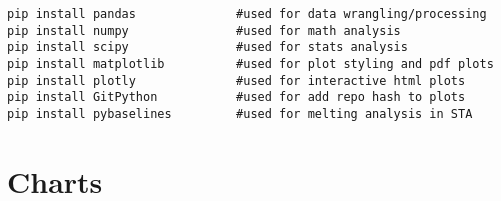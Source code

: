 \documentclass[12pt,oneside]{book}
\begin{document}
\begin{verbatim}
pip install pandas              #used for data wrangling/processing
pip install numpy               #used for math analysis
pip install scipy               #used for stats analysis
pip install matplotlib          #used for plot styling and pdf plots
pip install plotly              #used for interactive html plots
pip install GitPython           #used for add repo hash to plots
pip install pybaselines         #used for melting analysis in STA
\end{verbatim}

\chapter{Charts}
\label{sec:charts}


% 
\end{document}
